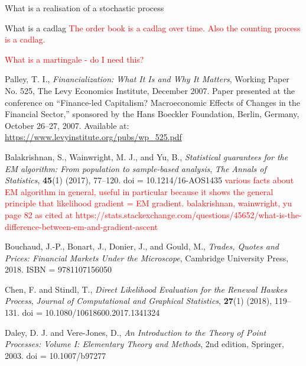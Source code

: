 \documentclass[honours,12pt]{unswthesis}
\numberwithin{equation}{section}
\begin{document}
What is a realisation of a stochastic process

What is a cadlag \textcolor{red}{The order book is a cadlag over time. Also the counting process is a cadlag.}

\textcolor{red}{What is a martingale - do I need this?}





\clearpage
{}


\begin{thebibliography}{999}

Palley, T. I.,
\textit{Financialization: What It Is and Why It Matters},
Working Paper No. 525, The Levy Economics Institute, December 2007.
Paper presented at the conference on “Finance-led Capitalism? Macroeconomic Effects of Changes in the Financial Sector,” sponsored by the Hans Boeckler Foundation, Berlin, Germany, October 26–27, 2007.
Available at: \url{https://www.levyinstitute.org/pubs/wp\_525.pdf}

Balakrishnan, S., Wainwright, M. J., and Yu, B.,
\textit{Statistical guarantees for the EM algorithm: From population to sample-based analysis},
\textit{The Annals of Statistics},
\textbf{45}(1) (2017), 77--120.
doi = {10.1214/16-AOS1435}
\textcolor{red}{various facts about EM algorithm in general, useful in particular because it shows the general principle that likelihood gradient = EM gradient. balakrishnan, wainwright, yu page 82 as cited at https://stats.stackexchange.com/questions/45652/what-is-the-difference-between-em-and-gradient-ascent}

Bouchaud, J.-P., Bonart, J., Donier, J., and Gould, M.,
\textit{Trades, Quotes and Prices: Financial Markets Under the Microscope},
Cambridge University Press, 2018.
ISBN = {9781107156050}

Chen, F. and Stindl, T.,
\textit{Direct Likelihood Evaluation for the Renewal Hawkes Process},
\textit{Journal of Computational and Graphical Statistics},
\textbf{27}(1) (2018), 119--131.
doi = {10.1080/10618600.2017.1341324}

Daley, D. J. and Vere-Jones, D.,
\textit{An Introduction to the Theory of Point Processes: Volume I: Elementary Theory and Methods}, 2nd edition,
Springer, 2003.
doi = {10.1007/b97277}


\end{thebibliography}
\end{document}
